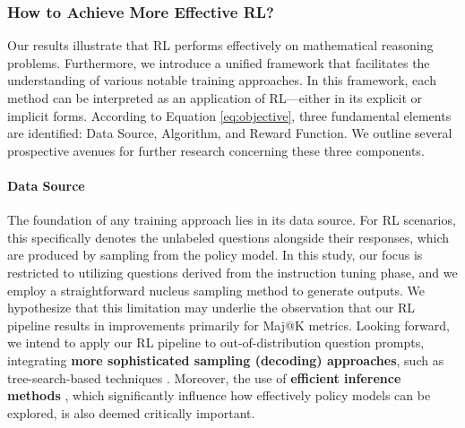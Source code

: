 \begin{itemize}[topsep=0pt]
\begin{itemize}[topsep=0pt]
\subsubsection{How to Achieve More Effective RL?}
\label{sec:effec_rl}
Our results illustrate that RL performs effectively on mathematical reasoning problems. Furthermore, we introduce a unified framework that facilitates the understanding of various notable training approaches. In this framework, each method can be interpreted as an application of RL—either in its explicit or implicit forms. According to Equation \ref{eq:objective}, three fundamental elements are identified: Data Source, Algorithm, and Reward Function. We outline several prospective avenues for further research concerning these three components.

\paragraph{Data Source} The foundation of any training approach lies in its data source. For RL scenarios, this specifically denotes the unlabeled questions alongside their responses, which are produced by sampling from the policy model. In this study, our focus is restricted to utilizing questions derived from the instruction tuning phase, and we employ a straightforward nucleus sampling method to generate outputs. We hypothesize that this limitation may underlie the observation that our RL pipeline results in improvements primarily for Maj@K metrics. Looking forward, we intend to apply our RL pipeline to out-of-distribution question prompts, integrating \textbf{more sophisticated sampling (decoding) approaches}, such as tree-search-based techniques \citep{yao2023tree}. Moreover, the use of \textbf{efficient inference methods} \citep{xia-etal-2023-speculative,leviathan2023fast,kwon2023efficient,xia2024unlocking}, which significantly influence how effectively policy models can be explored, is also deemed critically important.


\end{itemize}
\end{itemize}
